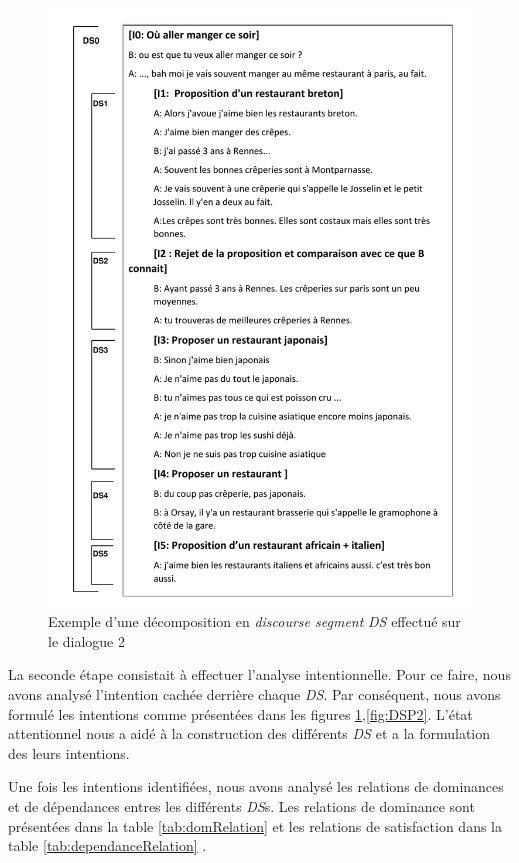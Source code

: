 \begin{figure}[!h]
	\includegraphics[width=5in]{Figures/dsp_analysis.pdf}
	\caption{\label{fig:DSP} Exemple d'une décomposition en \emph{discourse segment} \emph{DS} effectué sur le dialogue 2}
\end{figure} 

La seconde étape consistait à effectuer l'analyse intentionnelle. Pour ce faire, nous avons analysé l'intention cachée derrière chaque \emph{DS}. Par conséquent, nous avons formulé les intentions comme présentées dans les figures \ref{fig:DSP},\ref{fig:DSP2}.  L'état attentionnel nous a aidé à la construction des différents \emph{DS} et a la formulation des leurs intentions.

Une fois les intentions identifiées, nous avons analysé les relations de dominances et de dépendances entres les différents \emph{DS}s. Les relations de dominance sont présentées dans la table \ref{tab:domRelation} et les relations de satisfaction dans la table \ref{tab:dependanceRelation} .



